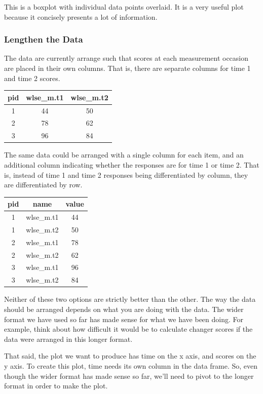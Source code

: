 \documentclass[
]{book}
\begin{document}
This is a boxplot with individual data points overlaid. It is a very useful plot because it concisely presents a lot of information.

\hypertarget{lengthen-the-data}{%
\subsubsection{Lengthen the Data}\label{lengthen-the-data}}

The data are currently arrange such that scores at each measurement occasion are placed in their own columns. That is, there are separate columns for time 1 and time 2 scores.

\begin{longtable}[]{@{}ccc@{}}
\toprule
pid & wlse\_m.t1 & wlse\_m.t2 \\
\midrule
\endhead
1 & 44 & 50 \\
2 & 78 & 62 \\
3 & 96 & 84 \\
\bottomrule
\end{longtable}

The same data could be arranged with a single column for each item, and an additional column indicating whether the responses are for time 1 or time 2. That is, instead of time 1 and time 2 responses being differentiated by column, they are differentiated by row.

\begin{longtable}[]{@{}ccc@{}}
\toprule
pid & name & value \\
\midrule
\endhead
1 & wlse\_m.t1 & 44 \\
1 & wlse\_m.t2 & 50 \\
2 & wlse\_m.t1 & 78 \\
2 & wlse\_m.t2 & 62 \\
3 & wlse\_m.t1 & 96 \\
3 & wlse\_m.t2 & 84 \\
\bottomrule
\end{longtable}

Neither of these two options are strictly better than the other. The way the data should be arranged depends on what you are doing with the data. The wider format we have used so far has made sense for what we have been doing. For example, think about how difficult it would be to calculate changer scores if the data were arranged in this longer format.

That said, the plot we want to produce has time on the x axis, and scores on the y axis. To create this plot, time needs its own column in the data frame. So, even though the wider format has made sense so far, we'll need to pivot to the longer format in order to make the plot.
\end{document}
